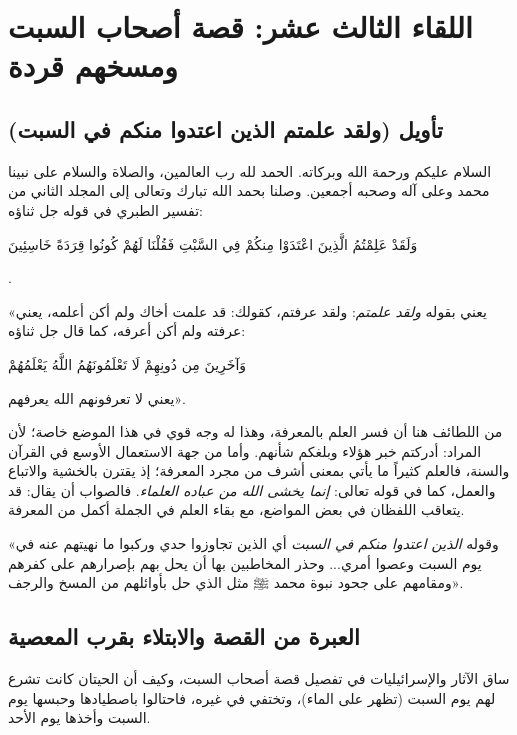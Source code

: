 \chapter{اللقاء الثالث عشر: قصة أصحاب السبت ومسخهم قردة}

\section{تأويل (ولقد علمتم الذين اعتدوا منكم في السبت)}
السلام عليكم ورحمة الله وبركاته. الحمد لله رب العالمين، والصلاة والسلام على نبينا محمد وعلى آله وصحبه أجمعين.
وصلنا بحمد الله تبارك وتعالى إلى المجلد الثاني من تفسير الطبري في قوله جل ثناؤه: \begin{ayah}وَلَقَدْ عَلِمْتُمُ الَّذِينَ اعْتَدَوْا مِنكُمْ فِي السَّبْتِ فَقُلْنَا لَهُمْ كُونُوا قِرَدَةً خَاسِئِينَ\end{ayah}.

 «يعني بقوله \textit{ولقد علمتم}: ولقد عرفتم، كقولك: قد علمت أخاك ولم أكن أعلمه، يعني عرفته ولم أكن أعرفه، كما قال جل ثناؤه: \begin{ayah}وَآخَرِينَ مِن دُونِهِمْ لَا تَعْلَمُونَهُمُ اللَّهُ يَعْلَمُهُمْ\end{ayah} يعني لا تعرفونهم الله يعرفهم».

\begin{fawaid}
من اللطائف هنا أن  فسر العلم بالمعرفة، وهذا له وجه قوي في هذا الموضع خاصة؛ لأن المراد: أدركتم خبر هؤلاء وبلغكم شأنهم. وأما من جهة الاستعمال الأوسع في القرآن والسنة، فالعلم كثيراً ما يأتي بمعنى أشرف من مجرد المعرفة؛ إذ يقترن بالخشية والاتباع والعمل، كما في قوله تعالى: \textit{إنما يخشى الله من عباده العلماء}. فالصواب أن يقال: قد يتعاقب اللفظان في بعض المواضع، مع بقاء العلم في الجملة أكمل من المعرفة.
\end{fawaid}

 «وقوله \textit{الذين اعتدوا منكم في السبت} أي الذين تجاوزوا حدي وركبوا ما نهيتهم عنه في يوم السبت وعصوا أمري... وحذر المخاطبين بها أن يحل بهم بإصرارهم على كفرهم ومقامهم على جحود نبوة محمد ﷺ مثل الذي حل بأوائلهم من المسخ والرجف».

\separator

\section{العبرة من القصة والابتلاء بقرب المعصية}
ساق  الآثار والإسرائيليات في تفصيل قصة أصحاب السبت، وكيف أن الحيتان كانت تشرع لهم يوم السبت (تظهر على الماء)، وتختفي في غيره، فاحتالوا باصطيادها وحبسها يوم السبت وأخذها يوم الأحد.

